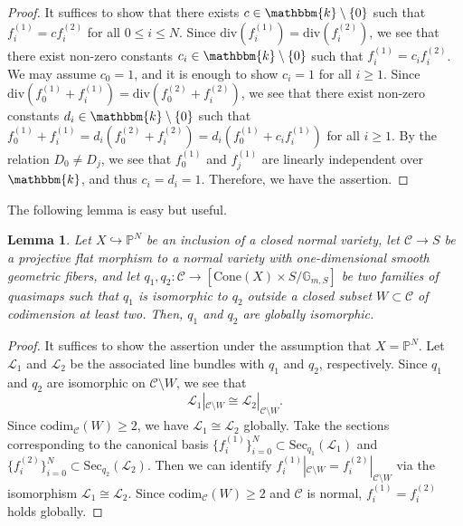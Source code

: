 \documentclass[12pt,twoside]{amsart}
\newtheorem{lem}[thm]{Lemma}
\theoremstyle{definition}
\begin{document}
\begin{proof}
It suffices to show that there exists $c\in\mathbbm{k}\setminus\{0\}$ such that $f^{(1)}_i=cf^{(2)}_i$ for all $0\le i\le N$.
Since $\mathrm{div}(f^{(1)}_i)=\mathrm{div}(f^{(2)}_i)$, we see that there exist non-zero constants $c_i\in\mathbbm{k}\setminus\{0\}$ such that $f^{(1)}_i=c_if^{(2)}_i$.
We may assume $c_0=1$, and it is enough to show $c_i=1$ for all $i\ge1$.
Since $\mathrm{div}(f^{(1)}_0+f^{(1)}_i)=\mathrm{div}(f^{(2)}_0+f^{(2)}_i)$, we see that there exist non-zero constants $d_i\in\mathbbm{k}\setminus\{0\}$ such that $f^{(1)}_0+f^{(1)}_i=d_i(f^{(2)}_0+f^{(2)}_i)=d_i(f^{(1)}_0+c_if^{(1)}_i)$ for all $i\ge1$.
By the relation $D_0\ne D_j$, we see that $f^{(1)}_0$ and $f^{(1)}_j$ are linearly independent over $\mathbbm{k}$, and thus $c_i=d_i=1$.
Therefore, we have the assertion.
\end{proof}


The following lemma is easy but useful. 

\begin{lem}\label{lem--quasi--map--S_2}
    Let $X\hookrightarrow \mathbb{P}^N$ be an inclusion of a closed normal variety, let $\mathcal{C}\to S$ be a projective flat morphism to a normal variety with one-dimensional smooth geometric fibers, and let $q_1,q_2\colon\mathcal{C}\to[\mathrm{Cone}(X)\times S/\mathbb{G}_{m,S}]$ be two families of quasimaps such that $q_1$ is isomorphic to $q_2$ outside a closed subset $W\subset \mathcal{C}$ of codimension at least two.
    Then, $q_1$ and $q_2$ are globally isomorphic. 
\end{lem}

\begin{proof}
 It suffices to show the assertion under the assumption that $X=\mathbb{P}^N$.
    Let $\mathscr{L}_1$ and $\mathscr{L}_2$ be the associated line bundles with $q_1$ and $q_2$, respectively.
    Since $q_1$ and $q_2$ are isomorphic on $\mathcal{C}\setminus W$, we see that 
    \[
    \mathscr{L}_1|_{\mathcal{C}\setminus W}\cong \mathscr{L}_2|_{\mathcal{C}\setminus W}.
    \]
 Since $\mathrm{codim}_{\mathcal{C}}(W)\ge 2$, we have $\mathscr{L}_1\cong \mathscr{L}_2$ globally.
 Take the sections corresponding to the canonical basis $\{ f^{(1)}_i\}_{i=0}^N\subset \mathrm{Sec}_{q_1}(\mathscr{L}_1)$ and $\{ f^{(2)}_i\}_{i=0}^N\subset \mathrm{Sec}_{q_2}(\mathscr{L}_2)$. 
Then we can identify $f^{(1)}_i|_{\mathcal{C}\setminus W}=f^{(2)}_i|_{\mathcal{C}\setminus W}$ via the isomorphism $\mathscr{L}_1\cong \mathscr{L}_2$.
 Since $\mathrm{codim}_{\mathcal{C}}(W)\ge 2$ and $\mathcal{C}$ is normal, $f^{(1)}_i=f^{(2)}_i$ holds globally.
\end{proof}
\end{document}
